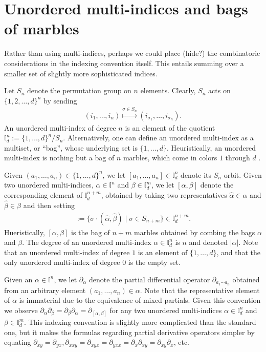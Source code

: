 \documentclass[12pt]{amsart}
\begin{document}
\section{Unordered multi-indices and bags of marbles}
Rather than using multi-indices, perhaps we could place (hide?) the
combinatoric considerations in the indexing convention itself.
This entails summing over a smaller set of slightly more sophisticated indices.

Let $S_n$ denote the permutation group on $n$ elements.
  Clearly, $S_n$ acts on $\{ 1,2,\dots, d\}^n$ by sending
  \begin{align*}
    (i_1,\dots,i_n) \stackrel{\sigma \in S_n}{\mapsto} ( i_{\sigma_1} ,\dots,i_{\sigma_n}).
  \end{align*}
  An unordered multi-index of degree $n$ is an element of the quotient $\mathbb{I}_d^n := \{1,\dots,d\}^n / S_n$.
  Alternatively, one can define an unordered multi-index as a multiset, or ``bag'', whose underlying set is $\{1,\dots,d\}$.
  Heuristically, an unordered multi-index is nothing but a bag of
  $n$ marbles, which come in colors $1$ through $d$  \cite{Blizard1989}.

Given $(a_1,\dots,a_n) \in \{ 1,\dots,d\}^n$, we let $[a_1 ,\dots, a_n] \in \mathbb{I}_d^n$ denote its $S_n$-orbit.
Given two unordered multi-indices, $\alpha \in \mathbb{I}^n$ and $\beta \in \mathbb{I}_d^m$, we let $[\alpha,\beta]$ denote the corresponding element of $\mathbb{I}_d^{n +m}$,
obtained by taking two representatives $\hat{\alpha} \in \alpha$ and $\hat{\beta} \in \beta$ and then setting
\begin{align*}
  [\alpha,\beta] := \{ \sigma \cdot (\hat{\alpha},\hat{\beta}) \mid \sigma \in S_{n+m}\} \in \mathbb{I}_d^{n+m}.
\end{align*}
Hueristically, $[\alpha,\beta]$ is the bag of $n+m$ marbles obtained
by combing the bags $\alpha$ and $\beta$.
The degree of an unordered multi-index $\alpha \in \mathbb{I}_d^n$ is $n$ and denoted $|\alpha|$.
Note that an unordered multi-index of degree $1$ is an element of $\{1,\dots,d\}$, and that the only unordered multi-index of degree $0$ is the empty set.

  Given an $\alpha \in \mathbb{I}^n$, we let $\partial_{\alpha}$ denote
the partial differential operator $\partial_{a_1 \cdots a_n}$ obtained from an arbitrary element $(a_1,\dots,a_n) \in \alpha$.  Note that the representative element of $\alpha$ is immaterial due to the equivalence of mixed partials.
Given this convention we observe $\partial_{\alpha} \partial_{\beta} = \partial_{\beta} \partial_{\alpha} = \partial_{[\alpha ,\beta]}$ for any two unordered multi-indices $\alpha \in \mathbb{I}_d^n$ and $\beta \in \mathbb{I}_d^m$.
This indexing convention is slightly more complicated than the standard
one, but it makes the formulas regarding partial derivative operators simpler by equating $\partial_{xy} = \partial_{yx}, \partial_{xxy}=\partial_{xyx}=\partial_{yxx} = \partial_x \partial_{xy} = \partial_{xy} \partial_x$, etc.
\end{document}
